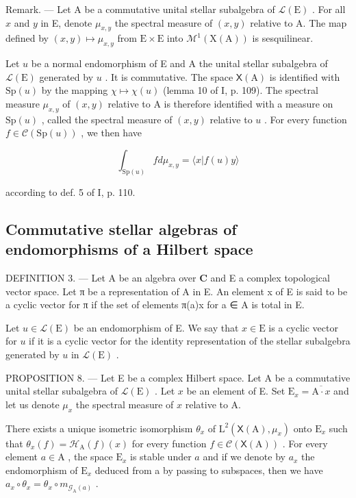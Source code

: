 Remark. --- Let A be a commutative unital stellar subalgebra of \(\mathcal{L}(\mathrm{E})\) . For all \(x\) and \(y\) in E, denote \(\mu_{x,y}\) the spectral measure of \((x,y)\) relative to A. The map defined by \((x,y) \mapsto \mu_{x,y}\) from \(\mathrm{E} \times \mathrm{E}\) into \(\mathcal{M}^1(\mathrm{X}(\mathrm{A}))\) is sesquilinear.

Let \(u\) be a normal endomorphism of E and A the unital stellar subalgebra of \(\mathcal{L}(\mathrm{E})\) generated by \(u\) . It is commutative. The space \(\mathsf{X}(\mathrm{A})\) is identified with \(\mathrm{Sp}(u)\) by the mapping \(\chi \mapsto \chi(u)\) (lemma 10 of I, p. 109). The spectral measure \(\mu_{x,y}\) of \((x,y)\) relative to A is therefore identified with a measure on \(\mathrm{Sp}(u)\) , called the spectral measure of \((x,y)\) relative to \(u\) . For every function \(f \in \mathcal{C}(\mathrm{Sp}(u))\) , we then have

\[
\int_ {\mathrm{Sp} (u)} f d \mu_ {x, y} = \langle x | f (u) y \rangle
\]

according to def. 5 of I, p. 110.

\subsection{Commutative stellar algebras of endomorphisms of a Hilbert space}

DEFINITION 3. --- Let A be an algebra over \(\mathbf{C}\) and E a complex topological vector space. Let π be a representation of A in E. An element x of E is said to be a cyclic vector for π if the set of elements π(a)x for a ∈ A is total in E.

Let \(u \in \mathcal{L}(\mathrm{E})\) be an endomorphism of E. We say that \(x \in \mathrm{E}\) is a cyclic vector for \(u\) if it is a cyclic vector for the identity representation of the stellar subalgebra generated by \(u\) in \(\mathcal{L}(\mathrm{E})\) .

PROPOSITION 8. --- Let E be a complex Hilbert space. Let A be a commutative unital stellar subalgebra of \(\mathcal{L}(\mathrm{E})\) . Let \(x\) be an element of E. Set \(\mathrm{E}_x = \overline{\mathrm{A} \cdot x}\) and let us denote \(\mu_x\) the spectral measure of \(x\) relative to A.

There exists a unique isometric isomorphism \(\theta_x\) of \(\mathrm{L}^2 (\mathsf{X}(\mathrm{A}),\mu_x)\) onto \(\mathrm{E}_x\) such that \(\theta_{x}(f) = \mathcal{H}_{\mathrm{A}}(f)(x)\) for every function \(f\in \mathcal{C}(\mathsf{X}(\mathrm{A}))\) . For every element \(a\in \mathrm{A}\) , the space \(\mathrm{E}_x\) is stable under \(a\) and if we denote by \(a_{x}\) the endomorphism of \(\mathrm{E}_x\) deduced from a by passing to subspaces, then we have \(a_{x}\circ \theta_{x} = \theta_{x}\circ m_{\mathcal{G}_{\mathrm{A}}(a)}\) .

